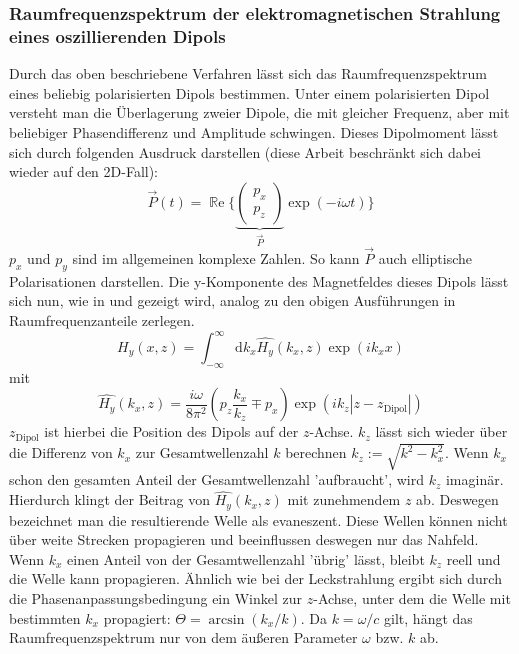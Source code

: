 \documentclass[titlepage,  ngerman]{article}
\renewcommand{\Re}{\operatorname{\mathbb{R}e}}
\begin{document}
	\subsubsection{Raumfrequenzspektrum der elektromagnetischen Strahlung eines oszillierenden Dipols}
	\label{sec:spatial_freq_dip}
	Durch das oben beschriebene Verfahren lässt sich das Raumfrequenzspektrum eines beliebig polarisierten Dipols bestimmen. Unter einem polarisierten Dipol versteht man die Überlagerung zweier Dipole, die mit gleicher Frequenz, aber mit beliebiger Phasendifferenz und Amplitude schwingen. Dieses Dipolmoment lässt sich durch folgenden Ausdruck darstellen (diese Arbeit beschränkt sich dabei wieder auf den 2D-Fall): 
	$$\vec{P}(t)= \Re\biggl\{\underbrace{\begin{pmatrix} p_x \\ p_z \end{pmatrix}}_{\vec{P}} \exp(-i\omega t)\biggr\} $$
	$p_x$ und $p_y$ sind im allgemeinen komplexe Zahlen. So kann $\vec{P}$ auch elliptische Polarisationen darstellen. Die y-Komponente des Magnetfeldes dieses Dipols lässt sich nun, wie in \cite{Novotny.2012b} und \cite{RodriguezFortuno.2013} gezeigt wird, analog zu den obigen Ausführungen in Raumfrequenzanteile zerlegen.
	\begin{equation}
		H_y(x, z) = \int_{-\infty}^{\infty}\mathrm{d}k_x\hat{H_y}(k_x, z)\exp(ik _xx) 
	\end{equation}
	mit
	\begin{equation}
		\label{eq:spatial_freq_dip}
		\boxed{\hat{H_y}(k_x, z) = \dfrac{i\omega}{8\pi^2}\left(p_z\dfrac{k_x}{k_z} \mp p_x\right)\exp(ik_z|z-z_{\mathrm{Dipol}}|)}
	\end{equation}
	$z_{\mathrm{Dipol}}$ ist hierbei die Position des Dipols auf der $z$-Achse. $k_z$ lässt sich wieder über die Differenz von $k_x$ zur Gesamtwellenzahl $k$ berechnen $k_z := \sqrt{k^2-k_x^2}$. Wenn $k_x$ schon den gesamten Anteil der Gesamtwellenzahl 'aufbraucht',  wird $k_z$ imaginär. Hierdurch klingt der Beitrag von $\hat{H_y}(k_x, z)$ mit zunehmendem $z$ ab. Deswegen bezeichnet man die resultierende Welle als evaneszent. Diese Wellen können nicht über weite Strecken propagieren und beeinflussen deswegen nur das Nahfeld. Wenn $k_x$ einen Anteil von der Gesamtwellenzahl 'übrig' lässt, bleibt $k_z$ reell und die Welle kann propagieren. Ähnlich wie bei der Leckstrahlung ergibt sich durch die Phasenanpassungsbedingung ein Winkel zur $z$-Achse, unter dem die Welle mit bestimmten $k_x$ propagiert: $\Theta = \arcsin(k_x/k)$. Da $k = \omega / c$ gilt, hängt das Raumfrequenzspektrum nur von dem äußeren Parameter $\omega$ bzw. $k$ ab. 
\end{document}
